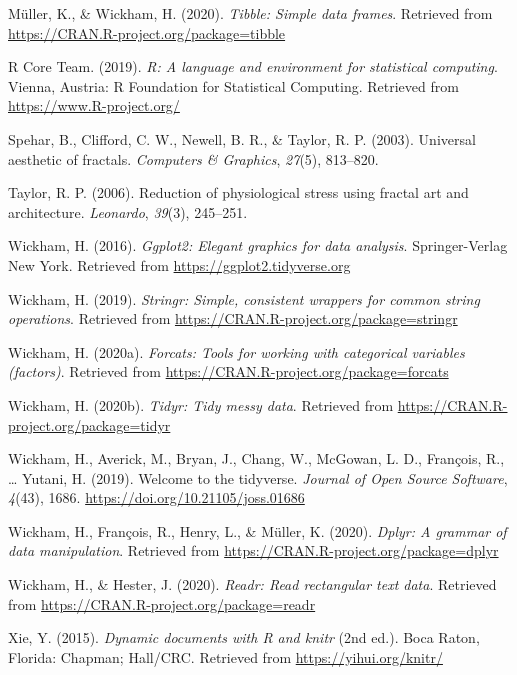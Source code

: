 \documentclass[english,jou]{apa6}
\begin{document}
\leavevmode\hypertarget{ref-R-tibble}{}%
Müller, K., \& Wickham, H. (2020). \emph{Tibble: Simple data frames}. Retrieved from \url{https://CRAN.R-project.org/package=tibble}

\leavevmode\hypertarget{ref-R-base}{}%
R Core Team. (2019). \emph{R: A language and environment for statistical computing}. Vienna, Austria: R Foundation for Statistical Computing. Retrieved from \url{https://www.R-project.org/}

\leavevmode\hypertarget{ref-spehar2003universal}{}%
Spehar, B., Clifford, C. W., Newell, B. R., \& Taylor, R. P. (2003). Universal aesthetic of fractals. \emph{Computers \& Graphics}, \emph{27}(5), 813--820.

\leavevmode\hypertarget{ref-taylor2006reduction}{}%
Taylor, R. P. (2006). Reduction of physiological stress using fractal art and architecture. \emph{Leonardo}, \emph{39}(3), 245--251.

\leavevmode\hypertarget{ref-R-ggplot2}{}%
Wickham, H. (2016). \emph{Ggplot2: Elegant graphics for data analysis}. Springer-Verlag New York. Retrieved from \url{https://ggplot2.tidyverse.org}

\leavevmode\hypertarget{ref-R-stringr}{}%
Wickham, H. (2019). \emph{Stringr: Simple, consistent wrappers for common string operations}. Retrieved from \url{https://CRAN.R-project.org/package=stringr}

\leavevmode\hypertarget{ref-R-forcats}{}%
Wickham, H. (2020a). \emph{Forcats: Tools for working with categorical variables (factors)}. Retrieved from \url{https://CRAN.R-project.org/package=forcats}

\leavevmode\hypertarget{ref-R-tidyr}{}%
Wickham, H. (2020b). \emph{Tidyr: Tidy messy data}. Retrieved from \url{https://CRAN.R-project.org/package=tidyr}

\leavevmode\hypertarget{ref-R-tidyverse}{}%
Wickham, H., Averick, M., Bryan, J., Chang, W., McGowan, L. D., François, R., \ldots{} Yutani, H. (2019). Welcome to the tidyverse. \emph{Journal of Open Source Software}, \emph{4}(43), 1686. \url{https://doi.org/10.21105/joss.01686}

\leavevmode\hypertarget{ref-R-dplyr}{}%
Wickham, H., François, R., Henry, L., \& Müller, K. (2020). \emph{Dplyr: A grammar of data manipulation}. Retrieved from \url{https://CRAN.R-project.org/package=dplyr}

\leavevmode\hypertarget{ref-R-readr}{}%
Wickham, H., \& Hester, J. (2020). \emph{Readr: Read rectangular text data}. Retrieved from \url{https://CRAN.R-project.org/package=readr}

\leavevmode\hypertarget{ref-R-knitr}{}%
Xie, Y. (2015). \emph{Dynamic documents with R and knitr} (2nd ed.). Boca Raton, Florida: Chapman; Hall/CRC. Retrieved from \url{https://yihui.org/knitr/}

\endgroup
\end{document}
